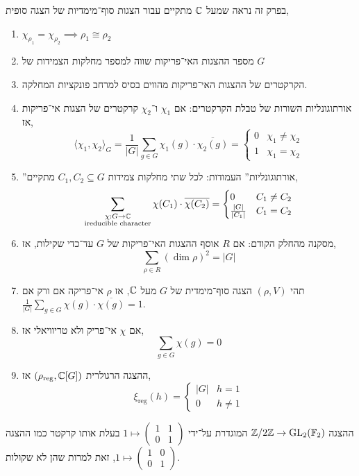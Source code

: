 בפרק זה נראה שמעל $\mathbb{C}$ מתקיים עבור הצגות סוף־מימדיות של הצגה סופית,
\begin{enumerate}
	\item $\chi_{\rho_1} = \chi_{\rho_2} \implies \rho_1 \cong \rho_2$
	\item מספר ההצגות האי־פריקות שווה למספר מחלקות הצמידות של $G$
	\item הקרקטרים של ההצגות האי־פריקות מהווים בסיס למרחב פונקציות המחלקה.
	\item אורתוגונליות השורות של טבלת הקרקטרים: אם $\chi_1$ ו־$\chi_2$ קרקטרים של הצגות אי־פריקות אז,
		\[
			\langle \chi_1, \chi_2 \rangle_G
			= \frac{1}{|G|} \sum_{g \in G} \chi_1(g) \cdot \overline{\chi_2(g)}
			= \begin{cases}
				0 & \chi_1 \ne \chi_2 \\
				1 & \chi_1 = \chi_2
			\end{cases}
		\]
	\item ''אורתוגונליות'' העמודות:
		לכל שתי מחלקות צמידות $C_1, C_2 \subseteq G$ מתקיים,
		\[
			\sum_{\substack{\chi : G \to \mathbb{C} \\ \text{ireducible character}}} \chi(C_1) \cdot \overline{\chi(C_2)}
			= \begin{cases}
				0 & C_1 \ne C_2 \\
				\frac{|G|}{|C_1|} & C_1 = C_2
			\end{cases}
		\]
	\item מסקנה מהחלק הקודם: אם $R$ אוסף ההצגות האי־פריקות של $G$ עד־כדי שקילות, אז,
		\[
			\sum_{\rho \in R} {(\dim \rho)}^2
			= |G|
		\]
	\item תהי $(\rho, V)$ הצגה סוף־מימדית של $G$ מעל $\mathbb{C}$, אז $\rho$ אי־פריקה אם ורק אם $\frac{1}{|G|} \sum_{g \in G} \chi(g) \cdot \overline{\chi(g)} = 1$.
	\item אם $\chi$ אי־פריק ולא טריוויאלי אז,
		\[
			\sum_{g \in G} \chi(g) = 0
		\]
	\item ההצגה הרגולרית $(\rho_{\operatorname{reg}}, \mathbb{C}[G])$ אז,
		\[
			\xi_{\operatorname{reg}}(h)
			= \begin{cases}
				|G| & h = 1 \\
				0 & h \ne 1
			\end{cases}
		\]
\end{enumerate}
\begin{example}
	ההצגה $\mathbb{Z} / 2 \mathbb{Z} \to \operatorname{GL}_2(\mathbb{F}_2)$ המוגדרת על־ידי $1 \mapsto (\begin{smallmatrix} 1 & 1 \\ 0 & 1 \end{smallmatrix})$ בעלת אותו קרקטר כמו ההצגה $1 \mapsto (\begin{smallmatrix} 1 & 0 \\ 0 & 1 \end{smallmatrix})$,
	זאת למרות שהן לא שקולות.
\end{example}
